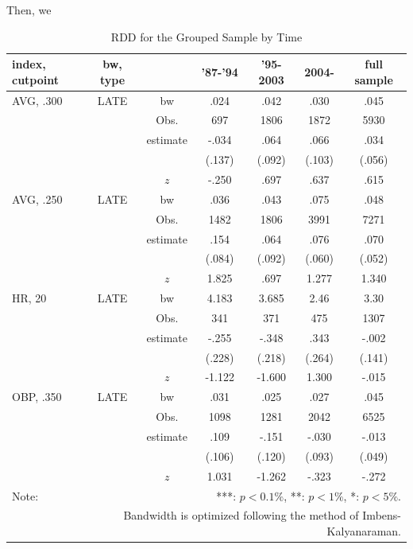 \documentclass[dvipdfmx, 12pt]{article}
\begin{document}
Then, we

\begin{table}
  \centering
  \caption{RDD for the Grouped Sample by Time}
  \label{RDD_Era}
  \footnotesize
  \begin{tabular}{lcccccc} \hline
    index, cutpoint & bw, type &  &'87-'94 & '95-2003 & 2004- &full sample \\ \hline \hline
    AVG, .300 & LATE & bw & .024 & .042 & .030 & .045 \\
    &  & Obs. & 697 & 1806 & 1872 & 5930 \\
    &  & estimate & -.034 & .064 & .066 & .034 \\
    &  & & (.137) & (.092) & (.103) & (.056) \\
    & & $z$ & -.250 & .697 & .637 & .615 \\ \hline
    AVG, .250 & LATE & bw & .036 & .043 &.075 & .048 \\
    &  & Obs. & 1482 & 1806 & 3991 & 7271 \\
    &  & estimate & .154 & .064 & .076 & .070 \\
    &  & & (.084) & (.092) & (.060) & (.052) \\
    & & $z$ & 1.825 & .697 & 1.277 & 1.340 \\ \hline
    HR, 20 & LATE & bw & 4.183 & 3.685 & 2.46 & 3.30 \\
    &  & Obs. & 341 & 371 & 475 & 1307 \\
    &  & estimate & -.255 & -.348 & .343 & -.002 \\
    &  & & (.228) & (.218) & (.264) & (.141) \\
    & & $z$ & -1.122 & -1.600 & 1.300 & -.015 \\ \hline
    OBP, .350 & LATE & bw & .031 & .025 & .027 & .045 \\
    &  & Obs. & 1098 & 1281 & 2042 & 6525 \\
    &  & estimate & .109 & -.151 & -.030 & -.013 \\
    &  & & (.106) & (.120) & (.093) & (.049) \\
    & & $z$ & 1.031 & -1.262 & -.323 & -.272 \\ \hline
    Note: & \multicolumn{6}{r}{***: $p<0.1\%$, **: $p<1\%$, *: $p<5\%$.} \\
    & \multicolumn{6}{r}{Bandwidth is optimized following the method of Imbens-Kalyanaraman.}
  \end{tabular}
\end{table}
\end{document}
